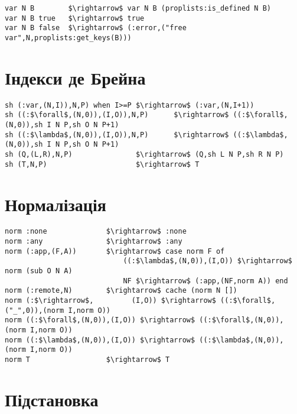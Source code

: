 \begin{lstlisting}[mathescape=true]
var N B        $\rightarrow$ var N B (proplists:is_defined N B)
var N B true   $\rightarrow$ true
var N B false  $\rightarrow$ (:error,("free var",N,proplists:get_keys(B)))
\end{lstlisting}

   \section{Індекси де Брейна}

\begin{lstlisting}[mathescape=true]
sh (:var,(N,I)),N,P) when I>=P $\rightarrow$ (:var,(N,I+1))
sh ((:$\forall$,(N,0)),(I,O)),N,P)      $\rightarrow$ ((:$\forall$,(N,0)),sh I N P,sh O N P+1)
sh ((:$\lambda$,(N,0)),(I,O)),N,P)      $\rightarrow$ ((:$\lambda$,(N,0)),sh I N P,sh O N P+1)
sh (Q,(L,R),N,P)               $\rightarrow$ (Q,sh L N P,sh R N P)
sh (T,N,P)                     $\rightarrow$ T
\end{lstlisting}

   \section{Нормалізація}

\begin{lstlisting}[mathescape=true]
norm :none              $\rightarrow$ :none
norm :any               $\rightarrow$ :any
norm (:app,(F,A))       $\rightarrow$ case norm F of
                            ((:$\lambda$,(N,0)),(I,O)) $\rightarrow$ norm (sub O N A)
                            NF $\rightarrow$ (:app,(NF,norm A)) end
norm (:remote,N)        $\rightarrow$ cache (norm N [])
norm (:$\rightarrow$,         (I,O)) $\rightarrow$ ((:$\forall$,("_",0)),(norm I,norm O))
norm ((:$\forall$,(N,0)),(I,O)) $\rightarrow$ ((:$\forall$,(N,0)),      (norm I,norm O))
norm ((:$\lambda$,(N,0)),(I,O)) $\rightarrow$ ((:$\lambda$,(N,0)),      (norm I,norm O))
norm T                  $\rightarrow$ T
\end{lstlisting}

\lstset{xleftmargin=0cm}

\newpage

   \section{Підстановка}

